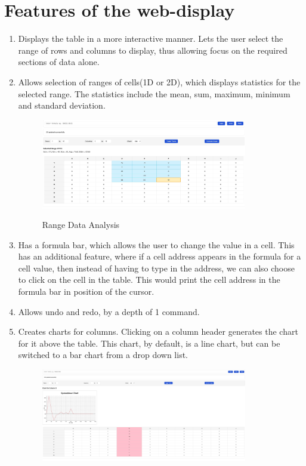 \documentclass{article}
\begin{document}
\section{Features of the web-display}

\begin{enumerate}
    \item Displays the table in a more interactive manner. Lets the user select the range of rows and columns to display, thus allowing focus on the required sections of data alone.
    \item Allows selection of ranges of cells(1D or 2D), which displays statistics for the selected range. The statistics include the mean, sum, maximum, minimum and standard deviation.
    \begin{figure}[t]
    \centering
    {{\includegraphics[width=9cm]{range.jpg}}}
    \caption{Range Data Analysis}
    \end{figure}
    \item Has a formula bar, which allows the user to change the value in a cell. This has an additional feature, where if a cell address appears in the formula for a cell value, then instead of having to type in the address, we can also choose to click on the cell in the table. This would print the cell address in the formula bar in position of the cursor.
    \item Allows undo and redo, by a depth of 1 command.
    \item Creates charts for columns. Clicking on a column header generates the chart for it above the table. This chart, by default, is a line chart, but can be switched to a bar chart from a drop down list.
    \begin{figure}[t]
    \centering
    {{\includegraphics[width=9cm]{graph.jpg}}}

\end{figure}
\end{enumerate}
\end{document}
